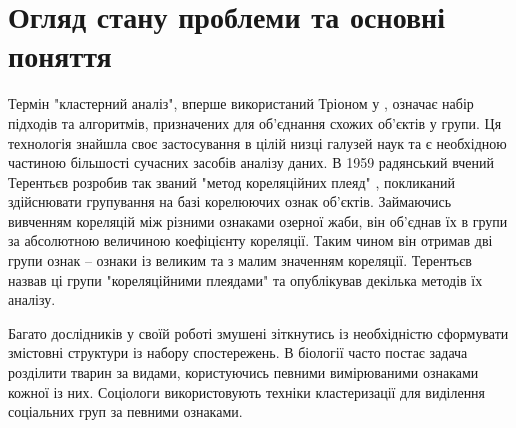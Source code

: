 \chapter{Огляд стану проблеми та основні поняття}\label{ch:01}

Термін "кластерний аналіз", вперше використаний Тріоном у \cite{Tryon:Cluster:1939}, означає набір підходів та алгоритмів, призначених для об'єднання схожих об'єктів у групи. Ця технологія знайшла своє застосування в цілій низці галузей наук та є необхідною частиною більшості сучасних засобів аналізу даних.
В 1959 радянський вчений Терентьєв розробив так званий "метод кореляційних плеяд" \cite{Terentyev}, покликаний здійснювати групування на базі корелюючих ознак об'єктів. Займаючись вивченням кореляцій між різними ознаками озерної жаби, він об'єднав їх в групи за абсолютною величиною коефіцієнту кореляції. Таким чином він отримав дві групи ознак -- ознаки із великим та з малим значенням кореляції. Терентьєв назвав ці групи "кореляційними плеядами" та опублікував декілька методів їх аналізу.


Багато дослідників у своїй роботі змушені зіткнутись із необхідністю сформувати змістовні структури із набору спостережень. В біології часто постає задача розділити тварин за видами, користуючись певними вимірюваними ознаками кожної із них. Соціологи використовують техніки кластеризації для виділення соціальних груп за певними ознаками. 

